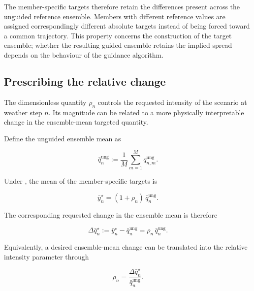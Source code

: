 The member-specific targets therefore retain the differences present across
the unguided reference ensemble. Members with different reference values are
assigned correspondingly different absolute targets instead of being forced
toward a common trajectory. This property concerns the construction of the
target ensemble; whether the resulting guided ensemble retains the implied
spread depends on the behaviour of the guidance algorithm.



\subsection{Prescribing the relative change}

The dimensionless quantity $\rho_n$ controls the requested intensity of the
scenario at weather step $n$. Its magnitude can be related to a more physically
interpretable change in the ensemble-mean targeted quantity.

Define the unguided ensemble mean as

\begin{equation}
    \bar{q}_n^{\mathrm{ung}}
    :=
    \frac{1}{M}
    \sum_{m=1}^{M}
    q_{n,m}^{\mathrm{ung}}.
    \label{eq:unguided-ensemble-mean}
\end{equation}

Under , the mean of the member-specific targets is

\begin{equation}
    \bar{y}_n^\star
    =
    (1+\rho_n)\,
    \bar{q}_n^{\mathrm{ung}}.
    \label{eq:ensemble-target}
\end{equation}

The corresponding requested change in the ensemble mean is therefore

\begin{equation}
    \Delta\bar{q}_n^\star
    :=
    \bar{y}_n^\star
    -
    \bar{q}_n^{\mathrm{ung}}
    =
    \rho_n\,
    \bar{q}_n^{\mathrm{ung}}.
    \label{eq:ensemble-mean-change}
\end{equation}

Equivalently, a desired ensemble-mean change can be translated into the
relative intensity parameter through

\begin{equation}
    \rho_n
    =
    \frac{
        \Delta\bar{q}_n^\star
    }{
        \bar{q}_n^{\mathrm{ung}}
    }.
    \label{eq:relative-change-from-mean-change}
\end{equation}

